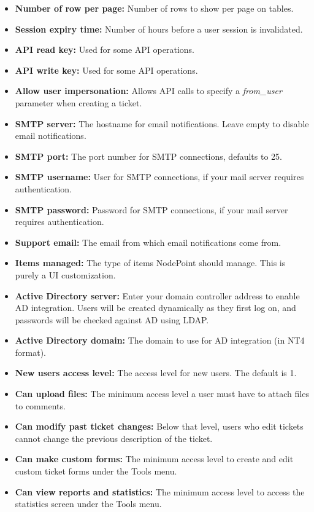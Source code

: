 \documentclass[11pt]{article}
\begin{document}
\begin{itemize}
\item \textbf{Number of row per page:} Number of rows to show per page on tables.
\item \textbf{Session expiry time:} Number of hours before a user session is invalidated.
\item \textbf{API read key:} Used for some API operations.
\item \textbf{API write key:} Used for some API operations.
\item \textbf{Allow user impersonation:} Allows API calls to specify a \textit{from\_user} parameter when creating a ticket.
\item \textbf{SMTP server:} The hostname for email notifications. Leave empty to disable email notifications.
\item \textbf{SMTP port:} The port number for SMTP connections, defaults to 25.
\item \textbf{SMTP username:} User for SMTP connections, if your mail server requires authentication.
\item \textbf{SMTP password:} Password for SMTP connections, if your mail server requires authentication.
\item \textbf{Support email:} The email from which email notifications come from.
\item \textbf{Items managed:} The type of items NodePoint should manage. This is purely a UI customization.
\item \textbf{Active Directory server:} Enter your domain controller address to enable AD integration. Users will be created dynamically as they first log on, and passwords will be checked against AD using LDAP.
\item \textbf{Active Directory domain:} The domain to use for AD integration (in NT4 format).
\item \textbf{New users access level:} The access level for new users. The default is 1.
\item \textbf{Can upload files:} The minimum access level a user must have to attach files to comments.
\item \textbf{Can modify past ticket changes:} Below that level, users who edit tickets cannot change the previous description of the ticket.
\item \textbf{Can make custom forms:} The minimum access level to create and edit custom ticket forms under the Tools menu.
\item \textbf{Can view reports and statistics:} The minimum access level to access the statistics screen under the Tools menu.

\end{itemize}
\end{document}
